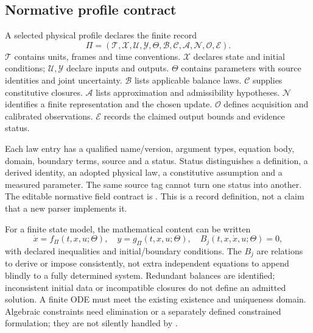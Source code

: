 \subsection{Normative profile contract}
A selected physical profile declares the finite record
\begin{equation}
 \Pi=(\mathcal T,\mathcal X,\mathcal U,\mathcal Y,\Theta,
       \mathcal B,\mathcal C,\mathcal A,\mathcal N,\mathcal O,\mathcal E).
\end{equation}
$\mathcal T$ contains units, frames and time conventions. $\mathcal X$ declares
state and initial conditions; $\mathcal U,\mathcal Y$ declare inputs and outputs.
$\Theta$ contains parameters with source identities and joint uncertainty.
$\mathcal B$ lists applicable balance laws. $\mathcal C$ supplies constitutive
closures. $\mathcal A$ lists approximation and admissibility hypotheses.
$\mathcal N$ identifies a finite representation and the chosen update.
$\mathcal O$ defines acquisition and calibrated observations.
$\mathcal E$ records the claimed output bounds and evidence status.

Each law entry has a qualified name/version, argument types, equation body,
domain, boundary terms, source and a status. Status distinguishes a definition,
a derived identity, an adopted physical law, a constitutive assumption and a
measured parameter. The same source tag cannot turn one status into another.
The editable normative field contract is .
This is a record definition, not a claim that a new parser implements it.

For a finite state model, the mathematical content can be written
\begin{equation}
 \dot x=f_\Pi(t,x,u;\Theta),\quad y=g_\Pi(t,x,u;\Theta),\quad
 B_j(t,x,\dot x,u;\Theta)=0,
 \label{eq:r13-profile}
\end{equation}
with declared inequalities and initial/boundary conditions. The $B_j$ are
relations to derive or impose consistently, not extra independent equations
to append blindly to a fully determined system. Redundant balances are
identified; inconsistent initial data or incompatible closures do not define
an admitted solution. A finite ODE must meet the existing existence and
uniqueness domain. Algebraic constraints need elimination or a separately
defined constrained formulation; they are not silently handled by .

